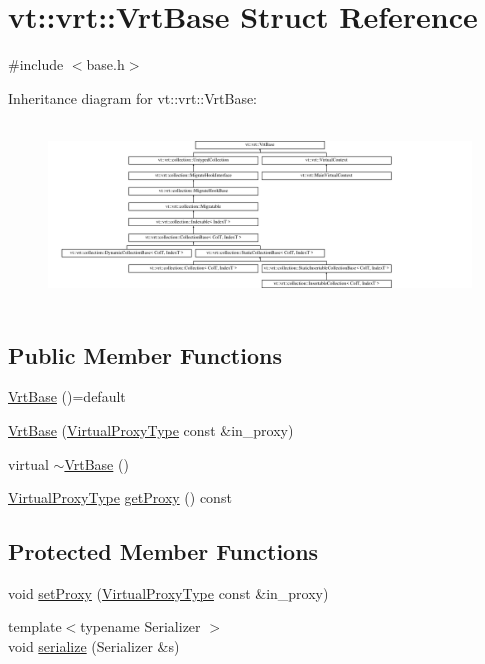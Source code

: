 \hypertarget{structvt_1_1vrt_1_1_vrt_base}{}\section{vt\+:\+:vrt\+:\+:Vrt\+Base Struct Reference}
\label{structvt_1_1vrt_1_1_vrt_base}


{\ttfamily \#include $<$base.\+h$>$}

Inheritance diagram for vt\+:\+:vrt\+:\+:Vrt\+Base\+:\begin{figure}[H]
\begin{center}
\leavevmode
\includegraphics[height=4.873803cm]{structvt_1_1vrt_1_1_vrt_base}
\end{center}
\end{figure}
\subsection*{Public Member Functions}
\begin{DoxyCompactItemize}
\item 
\hyperlink{structvt_1_1vrt_1_1_vrt_base_a5f98da4f22c55e58f5759eb84ac7cd06}{Vrt\+Base} ()=default
\item 
\hyperlink{structvt_1_1vrt_1_1_vrt_base_a7cc2b4f4ad3f2807e73b3d7a0a5b3676}{Vrt\+Base} (\hyperlink{namespacevt_a1b417dd5d684f045bb58a0ede70045ac}{Virtual\+Proxy\+Type} const \&in\+\_\+proxy)
\item 
virtual \hyperlink{structvt_1_1vrt_1_1_vrt_base_a16d15fcaabbf2e477315466dcaaa6f84}{$\sim$\+Vrt\+Base} ()
\item 
\hyperlink{namespacevt_a1b417dd5d684f045bb58a0ede70045ac}{Virtual\+Proxy\+Type} \hyperlink{structvt_1_1vrt_1_1_vrt_base_a30ea8cc8e915777f3106038c73cdb499}{get\+Proxy} () const
\end{DoxyCompactItemize}
\subsection*{Protected Member Functions}
\begin{DoxyCompactItemize}
\item 
void \hyperlink{structvt_1_1vrt_1_1_vrt_base_aa85b1aa3096a2adffe229927d76cebfd}{set\+Proxy} (\hyperlink{namespacevt_a1b417dd5d684f045bb58a0ede70045ac}{Virtual\+Proxy\+Type} const \&in\+\_\+proxy)
\item 
{\footnotesize template$<$typename Serializer $>$ }\\void \hyperlink{structvt_1_1vrt_1_1_vrt_base_acabd8e5dbd23894c036e870148ddba90}{serialize} (Serializer \&s)
\end{DoxyCompactItemize}


